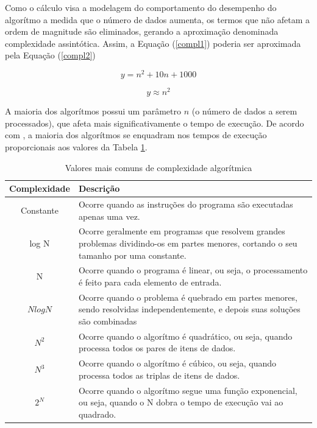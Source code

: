 {	 Como o cálculo visa a modelagem do comportamento do desempenho do algorítmo a medida que o número de dados aumenta, os termos que não afetam a ordem de magnitude são eliminados, gerando a aproximação denominada complexidade assintótica. Assim, a  Equação (\ref{compl1}) poderia ser aproximada pela  Equação (\ref{compl2})

	\begin{equation}
		y = n^{2} +10 n + 1000
	\label{compl1}
	\end{equation}

	\begin{equation}
		y \approx  n^{2} 
	\label{compl2}
	\end{equation}

	A maioria dos algorítmos possui um parâmetro $n$ (o número de dados a serem processados), que afeta mais significativamente o tempo de execução. De acordo com \cite{complexidade2}, a maioria dos algorítmos se enquadram nos tempos de execução proporcionais aos valores da Tabela \ref{complexidadeAlgoritmica}.

\begin{table}[ht]
	\centering	
	\begin{tabularx}{0.9\textwidth}{cX}
		\toprule
		\textbf{Complexidade} & \textbf{Descrição}  \\
		\midrule
		Constante &  Ocorre quando as instruções do programa são executadas apenas uma vez.\\
		log N & Ocorre geralmente em programas que resolvem grandes problemas dividindo-os em partes menores, cortando o seu tamanho por uma constante.  \\
		N & Ocorre quando o programa é linear, ou seja, o  processamento é feito para cada elemento de entrada. \\
		$ N log N$ & Ocorre quando o problema é quebrado em partes menores, sendo resolvidas independentemente, e depois suas soluções são combinadas \\
		$ N^{2}$ & Ocorre quando o algorítmo é quadrático, ou seja, quando processa todos os pares de itens de dados. \\
		$ N^{3}$ & Ocorre quando o algorítmo é cúbico, ou seja, quando processa todos as triplas de itens de dados. \\
		$ 2^{N}$ & Ocorre quando o algorítmo segue uma função exponencial, ou seja, quando o N dobra o tempo de execução vai ao quadrado. \\
	
		\bottomrule
	\end{tabularx}
	\caption{ Valores mais comuns de complexidade algorítmica}
	\label{complexidadeAlgoritmica}
\end{table}


}
